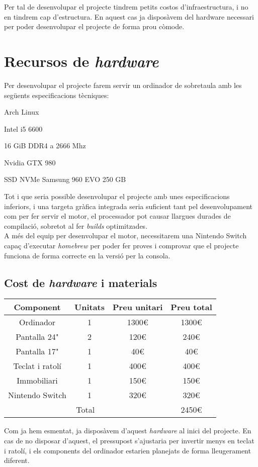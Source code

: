 Per tal de desenvolupar el projecte tindrem petits costos d'infraestructura, i no en tindrem cap d'estructura. En aquest cas ja disposàvem del hardware necessari per poder desenvolupar el projecte de forma prou còmode.
\section{Recursos de \textit{hardware}}
Per desenvolupar el projecte farem servir un ordinador de sobretaula amb les següents especificacions tècniques:
\begin{description}[font=$\bullet$~\normalfont\scshape\textbf]
\item [Sistema Operatiu:] Arch Linux
\item [Processador:] Intel i5 6600
\item [Memòria RAM:] 16 GiB DDR4 a 2666 Mhz
\item [Targeta gràfica:] Nvidia GTX 980
\item [Emmagatzematge:] SSD NVMe Samsung 960 EVO 250 GB
\end{description}
Tot i que seria possible desenvolupar el projecte amb unes especificacions inferiors, i una targeta gràfica integrada seria suficient tant pel desenvolupament com per fer servir el motor, el processador pot causar llargues durades de compilació, sobretot al fer \textit{builds} optimitzades.
\\
A més del equip per desenvolupar el motor, necessitarem una Nintendo Switch capaç d'executar \textit{homebrew} per poder fer proves i comprovar que el projecte funciona de forma correcte en la versió per la consola.
\subsection{Cost de \textit{hardware} i materials}
\hfill
\begin{center}
  \begin{tabular}{|c|c|c|c|}
    \hline
    Component & Unitats & Preu unitari & Preu total \\
    \hline \hline
    Ordinador & 1 & 1300€ & 1300€ \\
    \hline
    Pantalla 24" & 2 & 120€ & 240€ \\
    \hline
    Pantalla 17" & 1 & 40€ & 40€ \\
    \hline
    Teclat i ratolí & 1 & 400€ & 400€ \\
    \hline
    Immobiliari & 1 & 150€ & 150€ \\
    \hline
    Nintendo Switch & 1 & 320€ & 320€ \\
    \hline \hline
    \multicolumn{3}{|c|}{Total} & 2450€ \\
    \hline
  \end{tabular}
\end{center}
Com ja hem esmentat, ja disposàvem d'aquest \textit{hardware} al inici del projecte. En cas de no disposar d'aquest, el pressupost s'ajustaria per invertir menys en teclat i ratolí, i els components del ordinador estarien planejats de forma lleugerament diferent.

